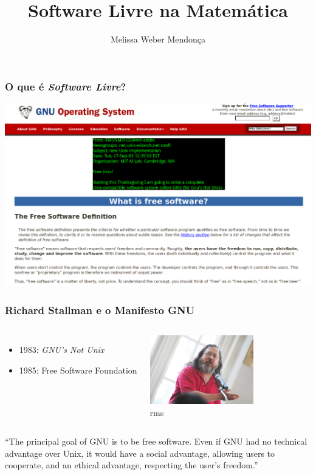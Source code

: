 \documentclass{beamer}
\title{Software Livre na Matemática}
\author{Melissa Weber Mendonça}
\date{}
\begin{document}
{%
\begin{frame}%

   \titlepage%
   
\end{frame}%
 }

\begin{frame}
   \frametitle{O que é \emph{Software Livre}?}
   \begin{center}
     \includegraphics[width=\textwidth]{gnu_free.png}
   \end{center}
\end{frame}

\begin{frame}
   \frametitle{Richard Stallman e o Manifesto GNU}
   \begin{columns}
     \column{6cm}
     \begin{itemize}
       \item 1983: \emph{GNU's Not Unix}
       \item 1985: Free Software Foundation
     \end{itemize}
     \column{4.5cm}
     \begin{center}
       \includegraphics[width=4.5cm,trim=40mm 0mm 40mm 0mm,clip]{stallman.jpg}\\
       rms
     \end{center}
   \end{columns}
   \begin{center}
     ``The principal goal of GNU is to be free software. Even if GNU had no technical advantage over Unix, it would have a social advantage, allowing users to cooperate, and an ethical advantage, respecting the user's freedom.''
   \end{center}
\end{frame}
\end{document}
